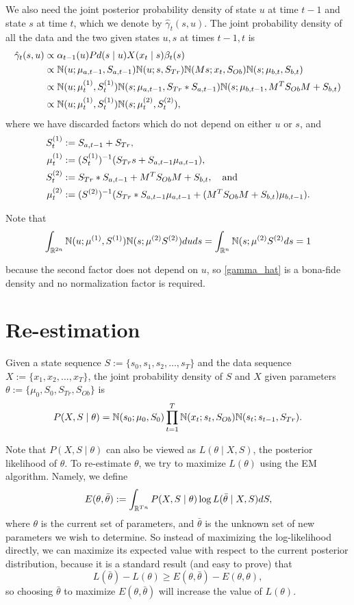 \documentclass[12pt,leqno]{article}
\begin{document}
We also need the joint posterior probability density of state $u$ at time $t-1$ and state $s$ at time $t$,
which we denote by $\hat{\gamma}_t(s,u)$. The joint probability density of all the data and the two given states
  $u,s$  at times $t-1,t$ is
  \begin{align}
    \hat{\gamma}_t(s,u) &\propto \alpha_{t-1}(u)Pd(s\mid u)X(x_t\mid s)\beta_t(s) \notag\\
    &\propto {\mathbb N}(u;\mu_{a,t-1},S_{a,t-1}){\mathbb N}(u;s,S_{Tr})  {\mathbb N}(Ms;x_t,S_{Ob}){\mathbb N}(s;\mu_{b,t},S_{b,t})\notag\\
    &\propto {\mathbb N}(u;\mu^{(1)}_t,S_t^{(1)}){\mathbb N}(s;\mu_{a,t-1},S_{Tr}*S_{a,t-1}){\mathbb N}(s;\mu_{b,t-1},M^TS_{Ob}M+S_{b,t})\notag\\
    &\propto {\mathbb N}(u;\mu^{(1)}_t,S_t^{(1)}){\mathbb N}(s;\mu^{(2)}_t,S^{(2)}_t),\label{gamma_hat}
  \end{align}
  where we have discarded factors which do not depend on either $u$ or $s$, and 
  \begin{align}
    S^{(1)}_t &:= S_{a,t-1}+S_{Tr},\notag\\
   \mu^{(1)}_t &:= (S_t^{(1)})^{-1}(S_{Tr}s + S_{a,t-1}\mu_{a,t-1}),\label{mu(1)}\\
    S^{(2)}_t &:= S_{Tr}*S_{a,t-1} + M^TS_{Ob}M+S_{b,t},\notag\quad\text{and}\\
    \mu^{(2)}_t &:= (S^{(2)})^{-1}(S_{Tr}*S_{a,t-1}\mu_{a,t-1} + (M^TS_{Ob}M+S_{b,t})\mu_{b,t-1})\label{mu(2)}.
  \end{align}

  Note that
  $$
  \int_{{\mathbb R}^{2n}}{\mathbb N}(u;\mu^{(1)},S^{(1)}){\mathbb N}(s;\mu^{(2)}S^{(2)})duds = \int_{{\mathbb R}^n}{\mathbb N}(s;\mu^{(2)}S^{(2)}ds = 1 
  $$
  
  because the second factor does not depend on $u$, so \eqref{gamma_hat} is a bona-fide density and no
  normalization factor is required.
  
\section{Re-estimation}
Given a state sequence $S := \{s_0,s_1,s_2,\dots,s_T\}$ and the data sequence $X := \{x_1,x_2,\dots,x_T\}$, the
joint probability density of $S$ and $X$ given parameters $\theta := \{\mu_0,S_0,S_{Tr},S_{Ob}\}$ is
$$
P(X,S\mid\theta) = {\mathbb N}(s_0;\mu_0,S_0)\prod_{t=1}^T{\mathbb N}(x_t;s_t,S_{Ob}){\mathbb N}(s_t;s_{t-1},S_{Tr}).
$$

Note that $P(X,S\mid\theta)$ can also be viewed as  $L(\theta\mid X,S)$, the posterior likelihood of $\theta$.
To re-estimate $\theta$, we try to maximize $L(\theta)$ using the EM algorithm. Namely, we define 
$$
E(\theta,\bar{\theta}) := \int_{{\mathbb R}^{Tn}}P(X,S\mid\theta)\log{L(\bar{\theta}\mid X,S)}dS,
$$
where $\theta$ is the current set of parameters, and $\bar{\theta}$ is the unknown set of new parameters
we wish to determine. So instead of maximizing the log-likelihood directly, we can maximize its expected
value with respect to the current posterior distribution, because it is a standard result (and easy to prove) that
$$
L(\bar{\theta}) - L(\theta) \ge E(\theta,\bar{\theta}) - E(\theta,\theta),
$$
so choosing $\bar{\theta}$ to maximize $E(\theta,\bar{\theta})$ will increase the value of $L(\theta)$.
\end{document}
